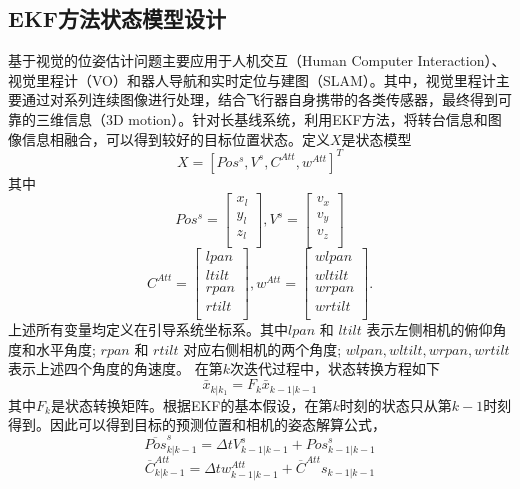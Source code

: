 \subsection{EKF方法状态模型设计}
基于视觉的位姿估计问题主要应用于人机交互（Human Computer Interaction）、视觉里程计（VO）和器人导航和实时定位与建图（SLAM）。其中，视觉里程计主要通过对系列连续图像进行处理，结合飞行器自身携带的各类传感器，最终得到可靠的三维信息（3D motion）。针对长基线系统，利用EKF方法，将转台信息和图像信息相融合，可以得到较好的目标位置状态。定义$X$是状态模型
\begin{equation}
X=[Pos^s, V^s, C^{Att}, w^{Att}]^T
\end{equation}
其中
$$
Pos^s=\left[\begin{array}{c}
x_l\\
y_l\\
z_l\\
\end{array}\right],
V^s=\left[\begin{array}{c}
v_x\\
v_y\\
v_z\\
\end{array}\right]
$$
$$
C^{Att}=\left[\begin{array}{c}
lpan\\
ltilt\\
rpan\\
rtilt\\
\end{array}\right],
w^{Att}=\left[\begin{array}{c}
wlpan\\
wltilt\\
wrpan\\
wrtilt\\
\end{array}\right].
$$
上述所有变量均定义在引导系统坐标系。其中$lpan$ 和 $ltilt$ 表示左侧相机的俯仰角度和水平角度; $rpan$ 和 $rtilt$ 对应右侧相机的两个角度; $wlpan, wltilt, wrpan, wrtilt$ 表示上述四个角度的角速度。
在第$k$次迭代过程中，状态转换方程如下
\begin{equation}
\bar{x}_{k|k_1}=F_k\bar{x}_{k-1|k-1}
\end{equation}
其中$F_k$是状态转换矩阵。根据EKF的基本假设，在第$k$时刻的状态只从第$k-1$时刻得到。因此可以得到目标的预测位置和相机的姿态解算公式，
\begin{equation}
\overline{Pos}^s_{k|k-1}=\Delta t V^s_{k-1|k-1} + {Pos}^s_{k-1|k-1}
\end{equation}
\begin{equation}
\overline{C}^{Att}_{k|k-1}=\Delta t w^{Att}_{k-1|k-1} + \overline{C}^{Att}s_{k-1|k-1}
\end{equation}
